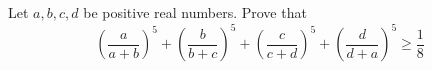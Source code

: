Let $a,b,c,d$ be positive real numbers. Prove that
\[(\frac{a}{a+b})^{5}+(\frac{b}{b+c})^{5}+(\frac{c}{c+d})^{5}+(\frac{d}{d+a})^{5}\ge \frac{1}{8}\]